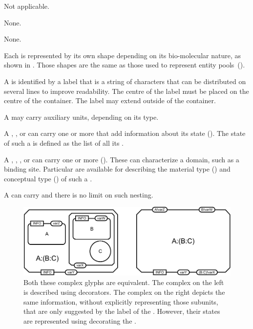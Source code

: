 \begin{glyphDescription}

\glyphSboTerm
Not applicable.

\glyphIncoming
None.

\glyphOutgoing
None.

\glyphContainer
Each  is represented by its own shape depending on its bio-molecular nature, as shown in .
Those shapes are the same as those used to represent entity pools~().

\glyphLabel
A  is identified by a label that is a string of characters that can be distributed on several lines to improve readability.
The centre of the label must be placed on the centre of the container.
The label may extend outside of the container.

\glyphAux A  may carry auxiliary units, depending on its type.

A , , or  can carry one or more  that add information about its state ().
The state of such a  is defined as the list of all its .

A , , , or  can carry one or more  ().
These can characterize a domain, such as a binding site.
Particular  are available for describing the material type () and conceptual type () of such a .

A  can carry  and there is no limit on such nesting. 

\end{glyphDescription}

\begin{figure}[htb]
  \centering
  \includegraphics[scale=0.8]{images/build/complex.pdf}
  \caption{Both these complex glyphs are equivalent.
      The complex on the left is described using  decorators.
      The complex on the right depicts the same information, without explicitly representing those subunits, that are only suggested by the label of the .
      However, their states are represented using  decorating the .}
  \label{fig:complexSubunits}
\end{figure} 

